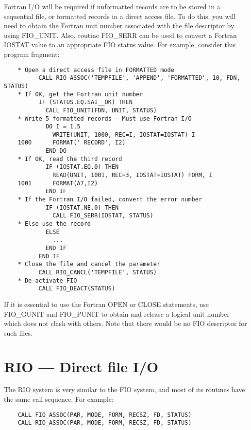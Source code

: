 Fortran I/O will be required if unformatted records are to be stored in a
sequential file, or formatted records in a direct access file.
To do this, you will need to obtain the Fortran unit number associated with
the file descriptor by using FIO\_UNIT.
Also, routine FIO\_SERR can be used to convert a Fortran IOSTAT value to an
appropriate FIO status value.
For example, consider this program fragment:

\begin{small}
\begin{verbatim}
    * Open a direct access file in FORMATTED mode
          CALL RIO_ASSOC('TEMPFILE', 'APPEND', 'FORMATTED', 10, FDN, STATUS)
    * If OK, get the Fortran unit number
          IF (STATUS.EQ.SAI__OK) THEN
            CALL FIO_UNIT(FDN, UNIT, STATUS)
    * Write 5 formatted records - Must use Fortran I/O
            DO I = 1,5
              WRITE(UNIT, 1000, REC=I, IOSTAT=IOSTAT) I
    1000      FORMAT(' RECORD', I2)
            END DO
    * If OK, read the third record
            IF (IOSTAT.EQ.0) THEN
              READ(UNIT, 1001, REC=3, IOSTAT=IOSTAT) FORM, I
    1001      FORMAT(A7,I2)
            END IF
    * If the Fortran I/O failed, convert the error number
            IF (IOSTAT.NE.0) THEN
              CALL FIO_SERR(IOSTAT, STATUS)
    * Else use the record
            ELSE
              ...
            END IF
          END IF
    * Close the file and cancel the parameter
          CALL RIO_CANCL('TEMPFILE', STATUS)
    * De-activate FIO
          CALL FIO_DEACT(STATUS)
\end{verbatim}
\end{small}

If it is essential to use the Fortran OPEN or CLOSE statements, use FIO\_GUNIT
and FIO\_PUNIT to obtain and release a logical unit number which does not
clash with others.
Note that there would be no FIO descriptor for such files.

\section{RIO --- Direct file I/O}
\label{S_rio}

The RIO system is very similar to the FIO system, and most of its routines have
the same call sequence.
For example:

\begin{small}
\begin{verbatim}
    CALL FIO_ASSOC(PAR, MODE, FORM, RECSZ, FD, STATUS)
    CALL RIO_ASSOC(PAR, MODE, FORM, RECSZ, FD, STATUS)
\end{verbatim}
\end{small}

